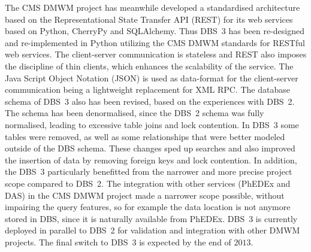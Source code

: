 The CMS DMWM project has meanwhile developed a standardised architecture based on the Representational State Transfer API (REST) \cite{REST} for its web services based on Python, CherryPy and SQLAlchemy. Thus DBS~3 has been re-designed and re-implemented in Python utilizing the CMS DMWM standards for RESTful web services. The client-server communication is stateless and REST also imposes the discipline of thin clients, which enhances the scalability of the service. The Java Script Object Notation (JSON) is used as data-format for the client-server communication being a lightweight replacement for XML RPC. The database schema of DBS~3 also has been revised, based on the experiences with DBS~2. The schema has been denormalised, since the DBS~2 schema was fully normalised, leading to excessive table joins and lock contention. In DBS~3 some tables were removed, as well as some relationships that were better modeled outside of the DBS schema. These changes sped up searches and also improved the insertion of data by removing foreign keys and lock contention. In addition, the DBS~3 particularly benefitted from the narrower and more precise project scope compared to DBS~2. The integration with other services (PhEDEx and DAS) in the CMS DMWM project made a narrower scope possible, without impairing the query features, so for example the data location is not anymore stored in DBS, since it is naturally available from PhEDEx. DBS~3 is currently deployed in parallel to DBS~2 for validation and integration with other DMWM projects. The final switch to DBS~3 is expected by the end of $2013$.

